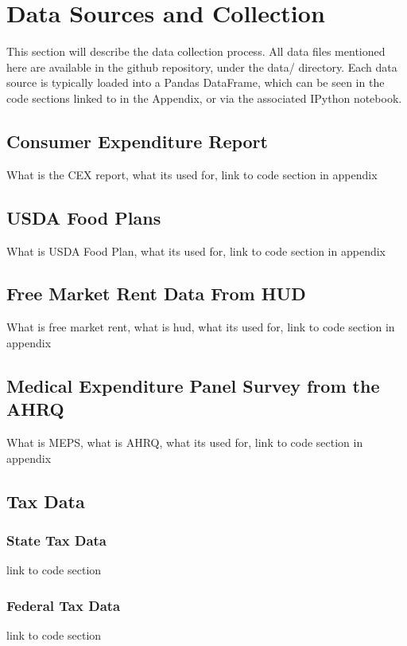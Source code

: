 \chapter{Data Sources and Collection}\label{ch:data_collection}

This section will describe the data collection process. All data files mentioned here are available in the github repository, under the data/ directory. Each data source is typically loaded into a Pandas DataFrame, which can be seen in the code sections linked to in the Appendix, or via the associated IPython notebook. 

\section{Consumer Expenditure Report}

What is the CEX report, what its used for, link to code section in appendix

\section{USDA Food Plans}

What is USDA Food Plan, what its used for, link to code section in appendix

\section{Free Market Rent Data From HUD}

What is free market rent, what is hud, what its used for, link to code section in appendix

\section{Medical Expenditure Panel Survey from the AHRQ}

What is MEPS, what is AHRQ, what its used for, link to code section in appendix

\section{Tax Data}

\subsection{State Tax Data}

link to code section

\subsection{Federal Tax Data}

link to code section